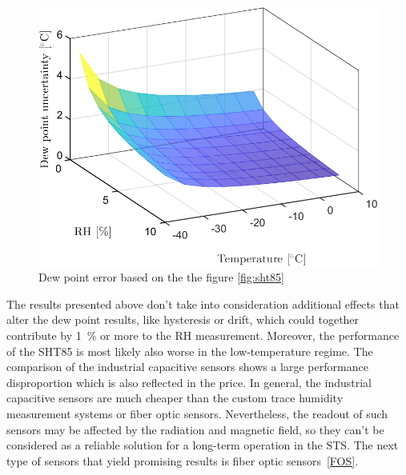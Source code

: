 \begin{figure}[!h]
\centering
\includegraphics[width=0.6\columnwidth]{Chapter5/images/SHTRH15T02.png}
\caption{Dew point error based on the the figure \ref{fig:sht85}}
\label{fig:sht85_dp}
\end{figure}
\newpage
The results presented above don't take into consideration additional effects that alter the dew point results, like hysteresis or drift, which could together contribute by 1~\% or more to the \gls{RH} measurement. Moreover, the performance of the SHT85 is most likely also worse in the low-temperature regime. The comparison of the industrial capacitive sensors shows a large performance disproportion which is also reflected in the price. In general, the industrial capacitive sensors are much cheaper than the custom trace humidity measurement systems or fiber optic sensors. Nevertheless, the readout of such sensors may be affected by the radiation and magnetic field, so they can't be considered as a reliable solution for a long-term operation in the \gls{STS}. The next type of sensors that yield promising results is fiber optic sensors~\ref{FOS}.

